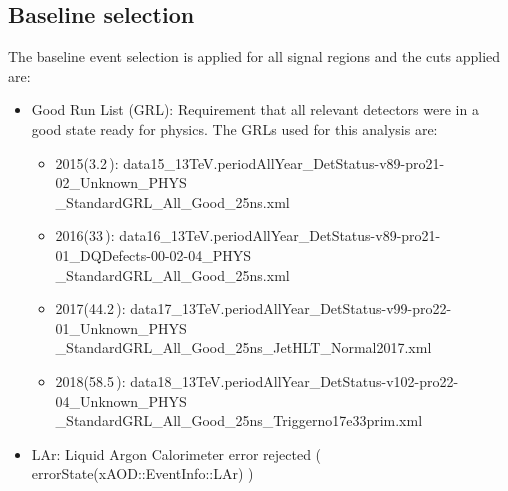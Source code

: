 \subsection{Baseline selection}
\label{sec:base_selection}
The baseline event selection is applied for all signal regions and
the cuts applied are:
\begin{itemize}
\item Good Run List (GRL): Requirement that all relevant detectors were in a good state ready for physics. The GRLs used for this analysis are:
	\begin{itemize}
                \item 2015(3.2\,\ifb): data15\_13TeV.periodAllYear\_DetStatus-v89-pro21-02\_Unknown\_PHYS\\\_StandardGRL\_All\_Good\_25ns.xml
        	\item 2016(33\,\ifb): data16\_13TeV.periodAllYear\_DetStatus-v89-pro21-01\_DQDefects-00-02-04\_PHYS\\\_StandardGRL\_All\_Good\_25ns.xml
        	\item 2017(44.2\,\ifb): data17\_13TeV.periodAllYear\_DetStatus-v99-pro22-01\_Unknown\_PHYS\\\_StandardGRL\_All\_Good\_25ns\_JetHLT\_Normal2017.xml
        	\item 2018(58.5\,\ifb): data18\_13TeV.periodAllYear\_DetStatus-v102-pro22-04\_Unknown\_PHYS\\\_StandardGRL\_All\_Good\_25ns\_Triggerno17e33prim.xml
	\end{itemize}
\item LAr: Liquid Argon Calorimeter error rejected ( errorState(xAOD::EventInfo::LAr) )

\end{itemize}

